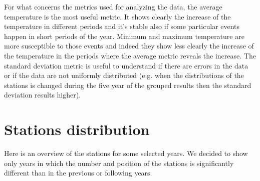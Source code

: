 \documentclass{vldb}
\begin{document}
For what concerns the metrics used for analyzing the data, the average temperature is the most useful metric. It shows clearly the increase of the temperature in different periods and it's stable also if some particular events happen in short periods of the year. Minimum and maximum temperature are more susceptible to those events and indeed they show less clearly the increase of the temperature in the periods where the average metric reveals the increase. The standard deviation metric is useful to understand if there are errors in the data or if the data are not uniformly distributed (e.g. when the distributions of the stations is changed during the five year of the grouped results then the standard deviation results higher).

\newpage
\appendix
\section{Stations distribution} \label{App:AppendixA}
Here is an overview of the stations for some selected years. We decided to show only years in which the number and position of the stations is significantly different than in the previous or following years.
\end{document}
